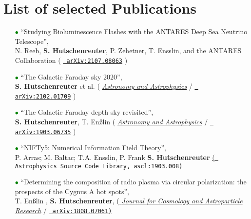 \documentclass[11pt,a4paper,sans, table, dvipsnames]{moderncv}        %
\begin{document}
\section{List of selected Publications}
\begin{itemize}

\item[\textcolor{Green}{$\bullet$}]{``Studying Bioluminescence Flashes with the ANTARES Deep Sea Neutrino Telescope'', \\  
N. Reeb, \textbf{S. Hutschenreuter}, P. Zehetner, T. Ensslin, and the ANTARES Collaboration ({\color{blue}  \href{https://arxiv.org/abs/2107.08063}{\texttt{{\color{blue} arXiv:2107.08063}}}} })

\vspace{6pt}

\item[\textcolor{Green}{$\bullet$}]{``The Galactic Faraday sky 2020'', \\  
\textbf{S. Hutschenreuter} et al. ({\color{blue} \href{https://www.aanda.org/articles/aa/abs/2022/01/aa40486-21/aa40486-21.htmll}{\textit{Astronomy and Astrophysics}} /  \href{https://arxiv.org/abs/2102.01709}{\texttt{{\color{blue} arXiv:2102.01709}}}} })

\vspace{6pt}

\item[\textcolor{Green}{$\bullet$}]{``The Galactic Faraday depth sky revisited'', \\  
\textbf{S. Hutschenreuter}, T. En{\ss}lin ({\color{blue} \href{https://www.aanda.org/articles/aa/full_html/2020/01/aa35479-19/aa35479-19.html}{\textit{Astronomy and Astrophysics}} /  \href{https://arxiv.org/abs/1903.06735}{\texttt{{\color{blue} arXiv:1903.06735}}}} })

\vspace{6pt}

\item[\textcolor{Green}{$\bullet$}]{``NIFTy5: Numerical Information Field Theory'', \\P. Arras; M. Baltac; T.A. Ensslin, P. Frank \textbf{S. Hutschenreuter} \href{http://ascl.net/1903.008}{(\texttt{{\color{blue} Astrophysics Source Code Library, ascl:1903.008})}}}

\vspace{6pt}

\item[\textcolor{Green}{$\bullet$}]{``Determining the composition of radio plasma via circular polarization: the prospects of the Cygnus A hot spots'', \\ 
T. En{\ss}lin , \textbf{S. Hutschenreuter},  ({\color{blue}\href{https://iopscience.iop.org/article/10.1088/1475-7516/2019/01/035/meta}{ \textit{Journal for Cosmology and Astroparticle Research}} / 
\href{https://arxiv.org/abs/1808.07061}{\texttt{{\color{blue} arXiv:1808.07061})}}}}


\end{itemize}
\end{document}
